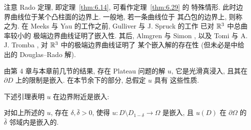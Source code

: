 注意 Rado 定理, 即定理~\ref{thm:6.14}, 可看作定理~\ref{thm:6.29} 的
特殊情形. 此时边界曲线位于某个凸柱面的边界上. 一般地, 若一条曲线位于
其凸包的边界上, 则称之为. 在 Meeks 与 Yau 的工作之前,
Gulliver 与 J. Spruck 的工作 \cite{GuSp} 已对 $\mathbb{R}^3$ 中总曲率较小的
极端边界曲线证明了嵌入性. 其后, Almgren 与 Simon \cite{AmSi}, 以及
Tomi 与 A. J. Tromba \cite{ToTr}, 对 $\mathbb{R}^3$ 中的极端边界曲线证明了
某个嵌入解的存在性 (但未必是中给出的 Douglas--Rado 解).

由第 4 章与本章前几节的结果, 存在 Plateau 问题的解 $u$, 它是光滑真浸入,
且其在 $\partial D$ 上的限制是嵌入. 在本节余下的部分, 总假定 $u$ 具有
这些性质.

下述引理表明 $u$ 在边界附近是嵌入:

\begin{lemma}
\label{lem:6.30}
对如上所述的 $u$, 存在 $\delta,\bar{\delta}>0$, 使得
$u:D\setminus D_{1-\delta}\to\Omega$ 是嵌入, 且 $u(D)$ 在
$\partial\Omega$ 的 $\bar{\delta}$ 邻域内是嵌入的.
\end{lemma}

